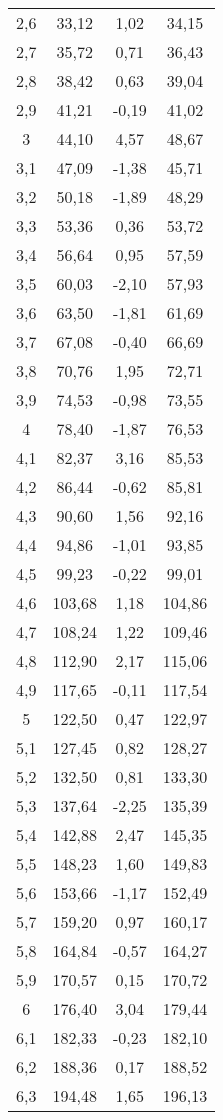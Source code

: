 \documentclass{article}
\begin{document}
\begin{longtable}[c]{|c|c|c|c|}
2,6 & 33,12 & 1,02 & 34,15\\
2,7 & 35,72 & 0,71 & 36,43\\
2,8 & 38,42 & 0,63 & 39,04\\
2,9 & 41,21 & -0,19 & 41,02\\
3 & 44,10 & 4,57 & 48,67\\
3,1 & 47,09 & -1,38 & 45,71\\
3,2 & 50,18 & -1,89 & 48,29\\
3,3 & 53,36 & 0,36 & 53,72\\
3,4 & 56,64 & 0,95 & 57,59\\
3,5 & 60,03 & -2,10 & 57,93\\
3,6 & 63,50 & -1,81 & 61,69\\
3,7 & 67,08 & -0,40 & 66,69\\
3,8 & 70,76 & 1,95 & 72,71\\
3,9 & 74,53 & -0,98 & 73,55\\
4 & 78,40 & -1,87 & 76,53\\
4,1 & 82,37 & 3,16 & 85,53\\
4,2 & 86,44 & -0,62 & 85,81\\
4,3 & 90,60 & 1,56 & 92,16\\
4,4 & 94,86 & -1,01 & 93,85\\
4,5 & 99,23 & -0,22 & 99,01\\
4,6 & 103,68 & 1,18 & 104,86\\
4,7 & 108,24 & 1,22 & 109,46\\
4,8 & 112,90 & 2,17 & 115,06\\
4,9 & 117,65 & -0,11 & 117,54\\
5 & 122,50 & 0,47 & 122,97\\
5,1 & 127,45 & 0,82 & 128,27\\
5,2 & 132,50 & 0,81 & 133,30\\
5,3 & 137,64 & -2,25 & 135,39\\
5,4 & 142,88 & 2,47 & 145,35\\
5,5 & 148,23 & 1,60 & 149,83\\
5,6 & 153,66 & -1,17 & 152,49\\
5,7 & 159,20 & 0,97 & 160,17\\
5,8 & 164,84 & -0,57 & 164,27\\
5,9 & 170,57 & 0,15 & 170,72\\
6 & 176,40 & 3,04 & 179,44\\
6,1 & 182,33 & -0,23 & 182,10\\
6,2 & 188,36 & 0,17 & 188,52\\
6,3 & 194,48 & 1,65 & 196,13\\

\end{longtable}
\end{document}
